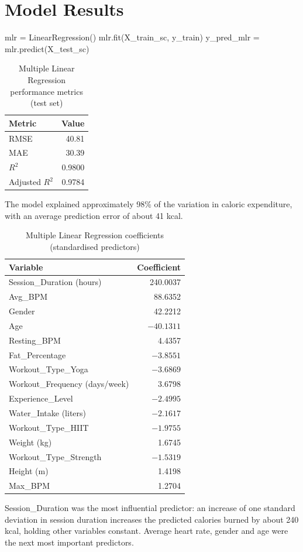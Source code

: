 \documentclass[12pt,a4paper]{report}
\begin{document}
\section{Model Results}
\begin{code}
mlr = LinearRegression()
mlr.fit(X_train_sc, y_train)
y_pred_mlr = mlr.predict(X_test_sc)
\end{code}
\begin{table}[H]
\centering
\begin{tabular}{lr}
\toprule
\textbf{Metric} & \textbf{Value}\\
\midrule
RMSE & 40.81\\
MAE & 30.39\\
$R^2$ & 0.9800\\
Adjusted $R^2$ & 0.9784\\
\bottomrule
\end{tabular}
\caption{Multiple Linear Regression performance metrics (test set)}
\end{table}
The model explained approximately 98\% of the variation in caloric expenditure, with an average prediction error of about 41 kcal.

\begin{table}[H]
\centering
\begin{tabular}{lr}
\toprule
\textbf{Variable} & \textbf{Coefficient}\\
\midrule
Session\_Duration (hours) & 240.0037\\
Avg\_BPM & 88.6352\\
Gender & 42.2212\\
Age & $-40.1311$\\
Resting\_BPM & 4.4357\\
Fat\_Percentage & $-3.8551$\\
Workout\_Type\_Yoga & $-3.6869$\\
Workout\_Frequency (days/week) & 3.6798\\
Experience\_Level & $-2.4995$\\
Water\_Intake (liters) & $-2.1617$\\
Workout\_Type\_HIIT & $-1.9755$\\
Weight (kg) & 1.6745\\
Workout\_Type\_Strength & $-1.5319$\\
Height (m) & 1.4198\\
Max\_BPM & 1.2704\\
\bottomrule
\end{tabular}
\caption{Multiple Linear Regression coefficients (standardised predictors)}
\end{table}
Session\_Duration was the most influential predictor: an increase of one standard deviation in session duration increases the predicted calories burned by about 240 kcal, holding other variables constant. Average heart rate, gender and age were the next most important predictors.
\end{document}

